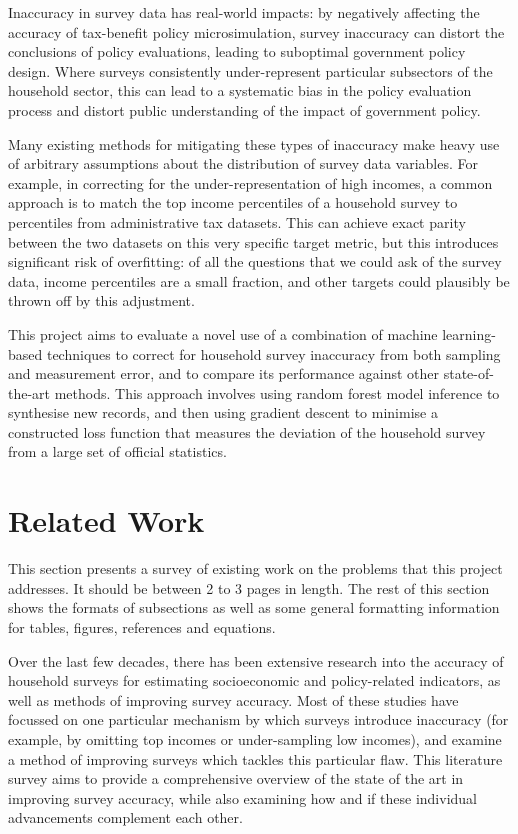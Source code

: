 \documentclass[10pt,journal,compsoc]{IEEEtran}
\begin{document}
Inaccuracy in survey data has real-world impacts: by negatively affecting the accuracy of tax-benefit policy microsimulation, survey inaccuracy can distort the conclusions of policy evaluations, leading to suboptimal government policy design. Where surveys consistently under-represent particular subsectors of the household sector, this can lead to a systematic bias in the policy evaluation process and distort public understanding of the impact of government policy.

Many existing methods for mitigating these types of inaccuracy make heavy use of arbitrary assumptions about the distribution of survey data variables. For example, in correcting for the under-representation of high incomes, a common approach is to match the top income percentiles of a household survey to percentiles from administrative tax datasets. This can achieve exact parity between the two datasets on this very specific target metric, but this introduces significant risk of overfitting: of all the questions that we could ask of the survey data, income percentiles are a small fraction, and other targets could plausibly be thrown off by this adjustment.

This project aims to evaluate a novel use of a combination of machine learning-based techniques to correct for household survey inaccuracy from both sampling and measurement error, and to compare its performance against other state-of-the-art methods. This approach involves using random forest model inference to synthesise new records, and then using gradient descent to minimise a constructed loss function that measures the deviation of the household survey from a large set of official statistics.

\section{Related Work}
This section presents a survey of existing work on the problems that this project addresses. It should be between 2 to 3 pages in length. The rest of this section shows the formats of subsections as well as some general formatting information for tables, figures, references and equations.

Over the last few decades, there has been extensive research into the accuracy of household surveys for estimating socioeconomic and policy-related indicators, as well as methods of improving survey accuracy. Most of these studies have focussed on one particular mechanism by which surveys introduce inaccuracy (for example, by omitting top incomes or under-sampling low incomes), and examine a method of improving surveys which tackles this particular flaw. This literature survey aims to provide a comprehensive overview of the state of the art in improving survey accuracy, while also examining how and if these individual advancements complement each other.
\end{document}
